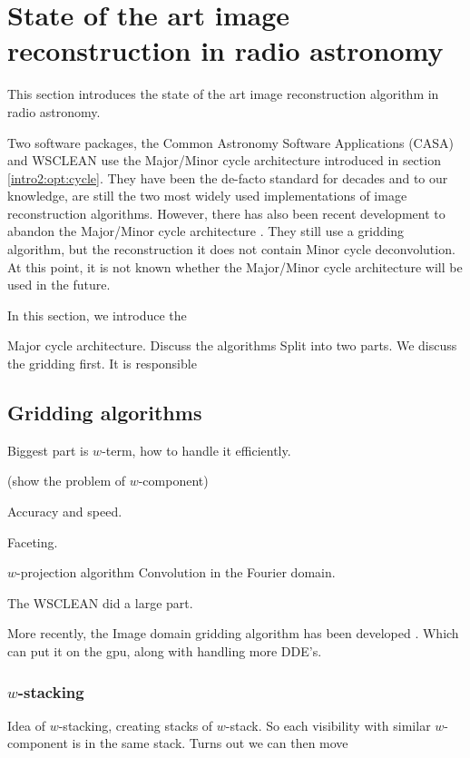 \section{State of the art image reconstruction in radio astronomy}
This section introduces the state of the art image reconstruction algorithm in radio astronomy. 

Two software packages, the Common Astronomy Software Applications (CASA)\cite{casa2019main} and WSCLEAN\cite{offringa2014wsclean} use the Major/Minor cycle architecture introduced in section \ref{intro2:opt:cycle}. They have been the de-facto standard for decades and to our knowledge, are still the two most widely used implementations of image reconstruction algorithms. However, there has also been recent development to abandon the Major/Minor cycle architecture \cite{pratley2017robust, dabbech2018cygnus}. They still use a gridding algorithm, but the reconstruction it does not contain Minor cycle deconvolution. At this point, it is not known whether the Major/Minor cycle architecture will be used in the future. 


In this section, we introduce the 


Major cycle architecture.
Discuss the algorithms 
Split into two parts. We discuss the gridding first. It is responsible

\subsection{Gridding algorithms}
Biggest part is $w$-term, how to handle it efficiently.


(show the problem of $w$-component)

Accuracy and speed.

Faceting.

$w$-projection algorithm \cite{cornwell2008noncoplanar}
Convolution in the Fourier domain.

The WSCLEAN \cite{offringa2014wsclean} did a large part.

More recently, the Image domain gridding algorithm has been developed \cite{veenboer2017image}. Which can put it on the gpu, along with handling more DDE's.

\subsubsection{$w$-stacking}
Idea of $w$-stacking, creating stacks of $w$-stack. So each visibility with similar $w$-component is in the same stack. Turns out we can then move

